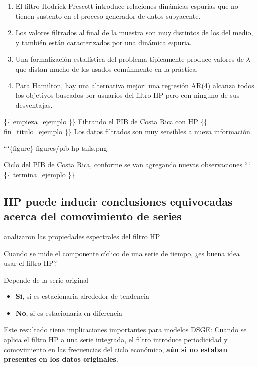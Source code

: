 \documentclass[11pt]{article}
\providecommand{\tightlist}{%
      \setlength{\itemsep}{0pt}\setlength{\parskip}{0pt}}
\begin{document}
\begin{enumerate}
\def\labelenumi{\arabic{enumi}.}
\tightlist
\item
  El filtro Hodrick-Prescott introduce relaciones dinámicas espurias que
  no tienen sustento en el proceso generador de datos subyacente.
\item
  Los valores filtrados al final de la muestra son muy distintos de los
  del medio, y también están caracterizados por una dinámica espuria.
\item
  Una formalización estadística del problema típicamente produce valores
  de \(\lambda\) que distan mucho de los usados comúnmente en la
  práctica.
\item
  Para Hamilton, hay una alternativa mejor: una regresión AR(4) alcanza
  todos los objetivos buscados por usuarios del filtro HP pero con
  ninguno de sus desventajas.
\end{enumerate}

\{\{ empieza\_ejemplo \}\} Filtrando el PIB de Costa Rica con HP \{\{
fin\_titulo\_ejemplo \}\} Los datos filtrados son muy sensibles a nueva
información.

```\{figure\} figures/pib-hp-tails.png

Ciclo del PIB de Costa Rica, conforme se van agregando nuevas
observaciones ``` \{\{ termina\_ejemplo \}\}

\hypertarget{hp-puede-inducir-conclusiones-equivocadas-acerca-del-comovimiento-de-series}{%
\subsection{HP puede inducir conclusiones equivocadas acerca del
comovimiento de
series}\label{hp-puede-inducir-conclusiones-equivocadas-acerca-del-comovimiento-de-series}}

\textcite{CogleyNason:1995} analizaron las propiedades espectrales del
filtro HP

Cuando se mide el componente cíclico de una serie de tiempo, ¿es buena
idea usar el filtro HP?

Depende de la serie original

\begin{itemize}
\tightlist
\item
  \textbf{Sí}, si es estacionaria alrededor de tendencia
\item
  \textbf{No}, si es estacionaria en diferencia
\end{itemize}

Este resultado tiene implicaciones importantes para modelos DSGE: Cuando
se aplica el filtro HP a una serie integrada, el filtro introduce
periodicidad y comovimiento en las frecuencias del ciclo económico,
\textbf{aún si no estaban presentes en los datos originales}.


    
    
    
\end{document}
